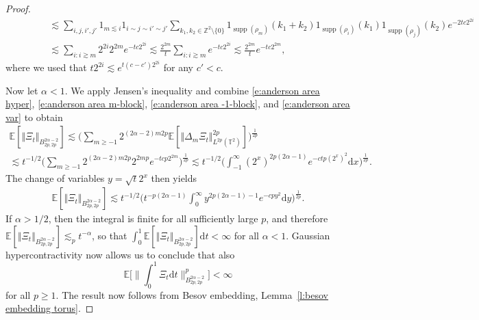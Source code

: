 \documentclass[11pt,a4paper]{article}
\newcommand{\mathd}{\mathrm{d}}
\newcommand{\tmop}[1]{\ensuremath{\operatorname{#1}}}
\theoremstyle{remark}
\newcommand{\E}{\mathbb{E}}
\begin{document}
\begin{proof}
\begin{align}
      &\hspace{40pt} \lesssim \sum_{i, j, i', j'} 1_{m \lesssim i} 1_{i \sim j \sim i' \sim j'} \sum_{k_1, k_2 \in \mathbb{Z}^2 \setminus\{0\}} 1_{\tmop{supp}(\rho_m)}(k_1 + k_2) 1_{\tmop{supp}( \rho_i )}(k_1) 1_{\tmop{supp} ( \rho_j)}(k_2) e^{- 2 t c 2^{2 i}} \\
      &\hspace{40pt} \lesssim \sum_{i:i \gtrsim m} 2^{2 i} 2^{2 m} e^{- t c 2^{2 i}} \lesssim \frac{2^{2 m}}{t} \sum_{i: i \gtrsim m} e^{- t c 2^{2 i}} \lesssim \frac{2^{2 m}}{t} e^{- t c 2^{2 m}},
   \end{align}
   where we used that $t 2^{2 i} \lesssim e^{t ( c - c' ) 2^{2 i}}$ for any $c' < c$.
   
   Now let $\alpha < 1$. We apply Jensen's inequality and combine \eqref{e:anderson area hyper}, \eqref{e:anderson area m-block}, \eqref{e:anderson area -1-block}, and \eqref{e:anderson area var} to obtain
   \begin{gather*}
      \E[\Vert  \Xi_t \Vert_{B^{2 \alpha - 2}_{2 p, 2 p}}] \lesssim \biggl( \sum_{m \ge - 1} 2^{(2 \alpha - 2) m 2 p} \E[\Vert  \Delta_m \Xi_t \Vert_{L^{2 p} (\mathbb{T}^2 )}^{2 p} ] \biggr)^{\frac{1}{2 p}} \\
      \lesssim t^{- 1 / 2} \biggl( \sum_{m \ge - 1} 2^{(2 \alpha - 2) m 2 p} 2^{2 m p} e^{- t c p 2^{2 m}} \biggr)^{\frac{1}{2 p}}  \lesssim t^{- 1 / 2} \biggl( \int_{- 1}^{\infty} ( 2^x )^{2 p ( 2 \alpha - 1 )} e^{- c t p ( 2^x )^2} \mathd x \biggr)^{\frac{1}{2 p}}.
   \end{gather*}
   The change of variables $y = \sqrt{t} 2^x$ then yields
   \begin{align*}
      \E[\Vert  \Xi_t \Vert_{B^{2 \alpha - 2}_{2 p, 2 p}}] \lesssim t^{- 1 / 2} \biggl( t^{- p ( 2 \alpha -1)} \int_0^{\infty} y^{2 p ( 2 \alpha - 1 ) - 1} e^{- c p y^2} \mathd y \biggr)^{\frac{1}{2 p}}.
   \end{align*}
   If $\alpha > 1/2$, then the integral is finite for all sufficiently large $p$, and therefore $\E[\Vert  \Xi_t \Vert_{B^{2 \alpha - 2}_{2 p, 2 p}}] \lesssim_p t^{- \alpha}$, so that $\int_0^1 \E[\Vert  \Xi_t \Vert_{B^{2 \alpha - 2}_{2 p, 2 p}}] \mathd t < \infty$ for all $\alpha < 1$. Gaussian hypercontractivity now allows us to conclude that also
   \[
      \E \Big[\Big\| \int_0^1 \Xi_t \mathd t\Big\|^p_{B^{2\alpha - 2}_{2p, 2p}} \Big] < \infty
   \]
   for all $p \ge 1$. The result now follows from Besov embedding, Lemma~\ref{l:besov embedding torus}.
\end{proof}
\end{document}
